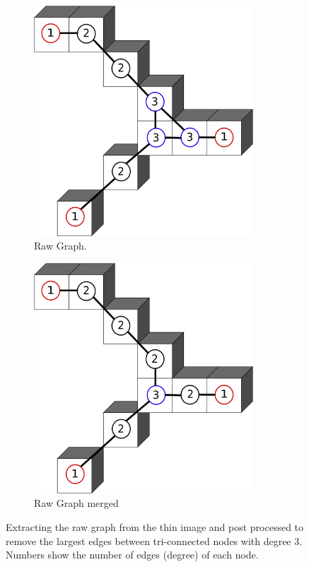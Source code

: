 \begin{figure}[!htb]
  \centering
  \begin{subfigure}{0.5\textwidth}
    \centering
    \includegraphics[width=0.9\textwidth]{Figures/chapter-image/dgtal/voxels_raw.png}%
    \caption{Raw Graph.}
    \label{subfig:graph_raw}
  \end{subfigure}%
  \begin{subfigure}{0.5\textwidth}
    \centering
    \includegraphics[width=0.9\textwidth]{Figures/chapter-image/dgtal/voxels_raw_merged.png}%
    \caption{Raw Graph merged}
    \label{subfig:graph_raw_merged}
  \end{subfigure}%
  \caption{Extracting the raw graph from the thin image and post processed to remove the largest edges between tri-connected nodes with degree 3. Numbers show the number of edges (degree) of each node. }
  \label{fig:raw_graph_extraction}
\end{figure}


